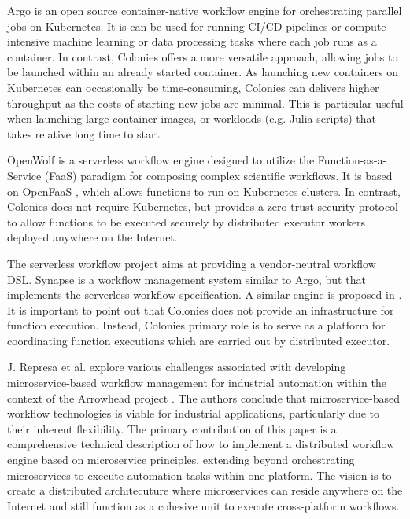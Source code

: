 \documentclass{article}
\begin{document}
Argo \cite{argowf} is an open source container-native workflow engine for orchestrating parallel jobs on Kubernetes. It is can be used for running CI/CD pipelines or compute intensive machine learning or data processing tasks where each job runs as a container. In contrast, Colonies offers a more versatile approach, allowing jobs to be launched within an already started container. As launching new containers on Kubernetes can occasionally be time-consuming, Colonies can delivers higher throughput as the costs of starting new jobs are minimal. This is particular useful when launching large container images, or workloads (e.g. Julia scripts) that takes relative long time to start. 

OpenWolf \cite{openwolf} is a serverless workflow engine designed to utilize the Function-as-a-Service (FaaS) paradigm for composing complex scientific workflows. It is based on OpenFaaS \cite{openfaas}, which allows functions to run on Kubernetes clusters. In contrast, Colonies does not require Kubernetes, but provides a zero-trust security protocol to allow functions to be executed securely by distributed executor workers deployed anywhere on the Internet.

The serverless workflow project \cite{serverlessworkflows} aims at providing a vendor-neutral workflow DSL. Synapse \cite{synapse} is a workflow management system similar to Argo, but that implements the serverless workflow specification. A similar engine is proposed in \cite{scafe}. It is important to point out that Colonies does not provide an infrastructure for function execution. Instead, Colonies primary role is to serve as a platform for coordinating function executions which are carried out by distributed executor.

J. Represa et al. \cite{GarciaRepresa1740746, GarciaRepresa1640771} explore various challenges associated with developing microservice-based workflow management for industrial automation within the context of the Arrowhead project \cite{delsing2017iot}. The authors conclude that microservice-based workflow technologies is viable for industrial applications, particularly due to their inherent flexibility. The primary contribution of this paper is a comprehensive technical description of how to implement a distributed workflow engine based on microservice principles, extending beyond orchestrating microservices to execute automation tasks within one platform. The vision is to create a distributed architecuture where microservices can reside anywhere on the Internet and still function as a cohesive unit to execute cross-platform workflows.  
\end{document}
